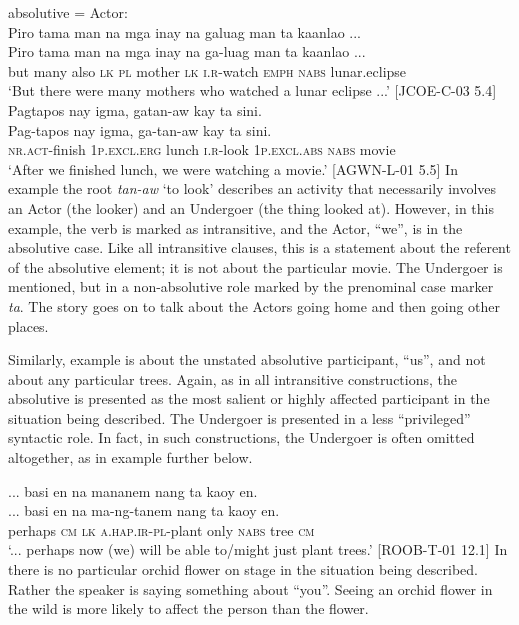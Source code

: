 \ea
\label{bkm:Ref125017724v}
absolutive = Actor: \\
Piro  tama  man  na  mga  inay  na  galuag  man  ta  kaanlao ... \\\smallskip
\gll Piro  tama  man  na  mga  inay  na  ga-luag  man  ta  kaanlao ... \\
but  many  also  \textsc{lk}  \textsc{pl}  mother  \textsc{lk}  \textsc{i.r}-watch  \textsc{emph}  \textsc{nabs}  lunar.eclipse \\
\glt ‘But there were many mothers who watched a lunar eclipse ...’ [JCOE-C-03 5.4]
\z
\ea
\label{bkm:Ref118364790v}
Pagtapos  nay  igma,  gatan-aw  kay  ta  sini. \\\smallskip
\gll Pag-tapos  nay  igma,  ga-tan-aw  kay  ta  sini. \\
\textsc{nr.act}-finish  1\textsc{p.excl.erg}  lunch  \textsc{i.r}-look  1\textsc{p.excl.abs}  \textsc{nabs}  movie \\
\glt ‘After we finished lunch, we were watching a movie.’ [AGWN-L-01 5.5]
\z
In example  the root \textit{tan-aw} ‘to look’ describes an activity that necessarily involves an Actor (the looker) and an Undergoer (the thing looked at). However, in this example, the verb is marked as intransitive, and the Actor, “we”, is in the absolutive case. Like all intransitive clauses, this is a statement about the referent of the absolutive element; it is not about the particular movie. The Undergoer is mentioned, but in a non-absolutive role marked by the prenominal case marker \textit{ta}. The story goes on to talk about the Actors going home and then going other places.

Similarly, example  is about the unstated absolutive participant, “us”, and not about any particular trees. Again, as in all intransitive constructions, the absolutive is presented as the most salient or highly affected participant in the situation being described. The Undergoer is presented in a less “privileged” syntactic role. In fact, in such constructions, the Undergoer is often omitted altogether, as in example  further below.

\ea
\label{bkm:Ref117000014}
 ... basi  en  na  mananem  nang  ta  kaoy  en. \\\smallskip
\gll ... basi  en  na  ma-ng-tanem  nang  ta  kaoy  en. \\
 {} perhaps  \textsc{cm}  \textsc{lk}  \textsc{a.hap.ir-pl}-plant  only  \textsc{nabs}  tree  \textsc{cm} \\
\glt ‘... perhaps now (we) will be able to/might just plant trees.’ [ROOB-T-01 12.1]
\z
In  there is no particular orchid flower on stage in the situation being described. Rather the speaker is saying something about “you”. Seeing an orchid flower in the wild is more likely to affect the person than the flower.

